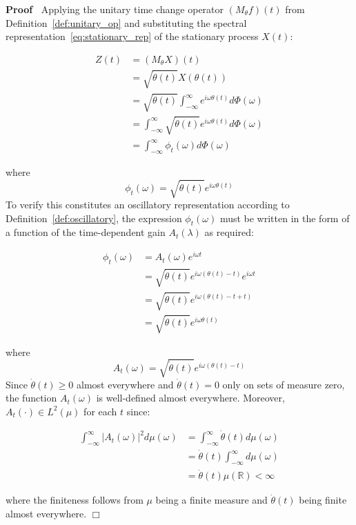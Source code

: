 \documentclass{article}
\newcommand{\cdummy}{\cdot}
\newenvironment{proof}{\noindent\textbf{Proof\ }}{\hspace*{\fill}$\Box$\medskip}
\begin{document}
\begin{proof}
  Applying the unitary time change operator $(M_{\theta} f) (t)$ from
  Definition~\ref{def:unitary_op} and substituting the spectral
  representation~\eqref{eq:stationary_rep} of the stationary process $X (t)$:
  
  \begin{align}
    Z (t) & = (M_{\theta} X) (t) \\
    & = \sqrt{\dot{\theta} (t)} X (\theta (t)) \\
    & = \sqrt{\dot{\theta} (t)}  \int_{- \infty}^{\infty} e^{i \omega \theta
    (t)} d \Phi (\omega) \\
    & = \int_{- \infty}^{\infty} \sqrt{\dot{\theta} (t)} e^{i \omega \theta
    (t)} d \Phi (\omega) \\
    & = \int_{- \infty}^{\infty} \phi_t (\omega) d \Phi (\omega) 
  \end{align}
  
  where
  \begin{equation}
    \phi_t (\omega) = \sqrt{\dot{\theta} (t)} e^{i \omega \theta (t)}
  \end{equation}
  To verify this constitutes an oscillatory representation according to
  Definition~\ref{def:oscillatory}, the expression $\phi_t (\omega)$ must be
  written in the form of a function of the time-dependent gain $A_t (\lambda)$
  as required:
  
  \begin{align}
    \phi_t (\omega) & = A_t (\omega) e^{i \omega t} \\
    & = \sqrt{\dot{\theta} (t)} e^{i \omega (\theta (t) - t)} e^{i \omega t}
    \\
    & = \sqrt{\dot{\theta} (t)} e^{i \omega (\theta (t) - t + t)} \\
    & = \sqrt{\dot{\theta} (t)} e^{i \omega \theta (t)} 
  \end{align}
  
  where
  \begin{equation}
    A_t (\omega) = \sqrt{\dot{\theta} (t)} e^{i \omega (\theta (t) - t)}
  \end{equation}
  Since $\dot{\theta} (t) \geq 0$ almost everywhere and $\dot{\theta} (t) = 0$
  only on sets of measure zero, the function $A_t (\omega)$ is well-defined
  almost everywhere. Moreover, $A_t (\cdummy) \in L^2 (\mu)$ for each $t$
  since:
  
  \begin{align}
    \int_{- \infty}^{\infty} |A_t (\omega) |^2 d \mu (\omega) & = \int_{-
    \infty}^{\infty} \dot{\theta} (t) d \mu (\omega) \\
    & = \dot{\theta} (t)  \int_{- \infty}^{\infty} d \mu (\omega) \\
    & = \dot{\theta} (t) \mu (\mathbb{R}) < \infty 
  \end{align}
  
  where the finiteness follows from $\mu$ being a finite measure and
  $\dot{\theta} (t)$ being finite almost everywhere.
\end{proof}
\end{document}
